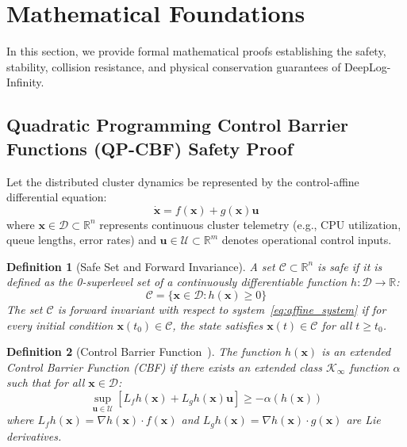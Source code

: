 \documentclass[letterpaper,twocolumn,10pt]{article}
\newtheorem{definition}{Definition}
\begin{document}
\section{Mathematical Foundations}
\label{sec:math}
In this section, we provide formal mathematical proofs establishing the safety, stability, collision resistance, and physical conservation guarantees of DeepLog-Infinity.

\subsection{Quadratic Programming Control Barrier Functions (QP-CBF) Safety Proof}
Let the distributed cluster dynamics be represented by the control-affine differential equation:
\begin{equation}
\label{eq:affine_system}
\dot{\mathbf{x}} = f(\mathbf{x}) + g(\mathbf{x})\mathbf{u}
\end{equation}
where $\mathbf{x} \in \mathcal{D} \subset \mathbb{R}^n$ represents continuous cluster telemetry (e.g., CPU utilization, queue lengths, error rates) and $\mathbf{u} \in \mathcal{U} \subset \mathbb{R}^m$ denotes operational control inputs.

\begin{definition}[Safe Set and Forward Invariance]
A set $\mathcal{C} \subset \mathbb{R}^n$ is safe if it is defined as the 0-superlevel set of a continuously differentiable function $h: \mathcal{D} \to \mathbb{R}$:
\begin{equation}
\mathcal{C} = \{\mathbf{x} \in \mathcal{D} : h(\mathbf{x}) \ge 0\}
\end{equation}
The set $\mathcal{C}$ is forward invariant with respect to system~\eqref{eq:affine_system} if for every initial condition $\mathbf{x}(t_0) \in \mathcal{C}$, the state satisfies $\mathbf{x}(t) \in \mathcal{C}$ for all $t \ge t_0$.
\end{definition}

\begin{definition}[Control Barrier Function~\cite{ames2019control}]
The function $h(\mathbf{x})$ is an extended Control Barrier Function (CBF) if there exists an extended class $\mathcal{K}_{\infty}$ function $\alpha$ such that for all $\mathbf{x} \in \mathcal{D}$:
\begin{equation}
\label{eq:cbf_condition}
\sup_{\mathbf{u} \in \mathcal{U}} \left[ L_f h(\mathbf{x}) + L_g h(\mathbf{x})\mathbf{u} \right] \ge -\alpha(h(\mathbf{x}))
\end{equation}
where $L_f h(\mathbf{x}) = \nabla h(\mathbf{x}) \cdot f(\mathbf{x})$ and $L_g h(\mathbf{x}) = \nabla h(\mathbf{x}) \cdot g(\mathbf{x})$ are Lie derivatives.
\end{definition}
\end{document}
